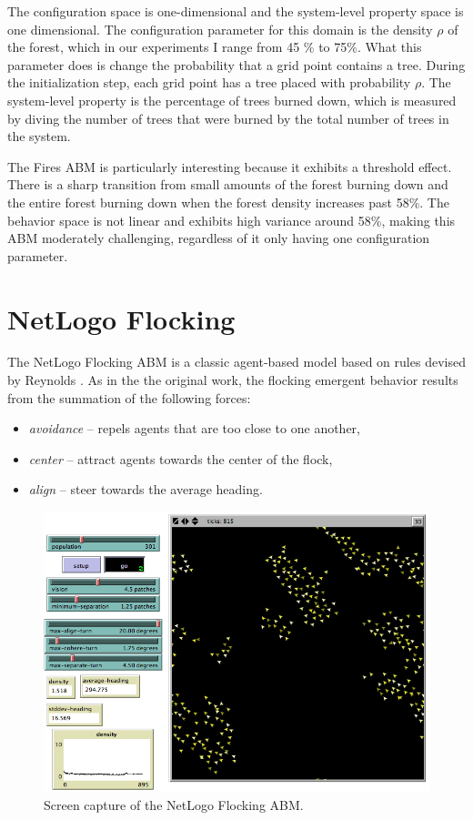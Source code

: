 The configuration space is one-dimensional and the system-level property space is one dimensional.
The configuration parameter for this domain is the density $\rho$ of the forest, which in our experiments I range from 45 \% to 75\%.
What this parameter does is change the probability that a grid point contains a tree.
During the initialization step, each grid point has a tree placed with probability $\rho$.
The system-level property is the percentage of trees burned down, which is measured by diving the number of trees that were burned by the total number of trees in the system.


The Fires ABM is particularly interesting because it exhibits a threshold effect.
There is a sharp transition from small amounts of the forest burning down and the entire forest burning down when the forest density increases past 58\%.
The behavior space is not linear and exhibits high variance around 58\%, making this ABM moderately challenging, regardless of it only having one configuration parameter.


 \section{NetLogo Flocking}

The NetLogo Flocking ABM is a classic agent-based model based on rules devised by Reynolds \cite{reynolds1987}.
As in the the original work, the flocking emergent behavior results from the summation of the following forces:
\begin{itemize}
	\item \textit{avoidance} -- repels agents that are too close to one another,
	\item \textit{center} -- attract agents towards the center of the flock,
	\item \textit{align} -- steer towards the average heading.
\end{itemize}

\begin{figure}[ht]
\centering
\includegraphics[scale=.333333]{images/flocking_ss.png}
\caption{Screen capture of the NetLogo Flocking ABM.}
\label{fig:flockingss}
\end{figure}

